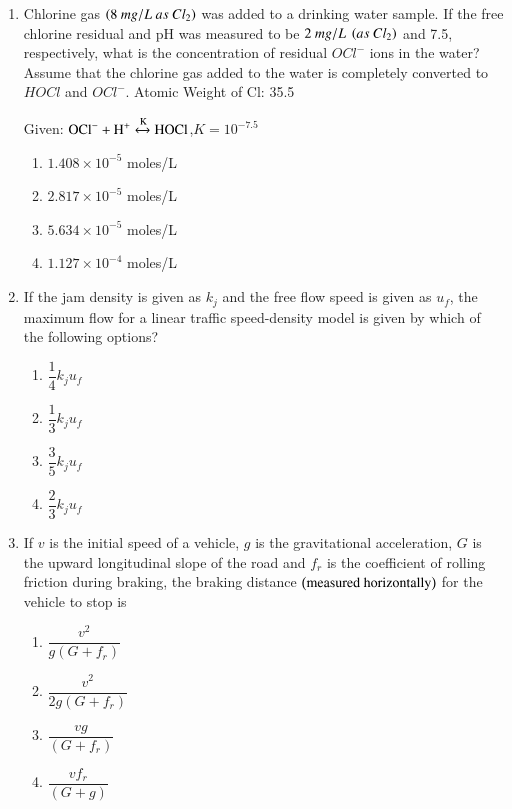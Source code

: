 \documentclass[journal,12pt,onecolumn]{IEEEtran}
\theoremstyle{remark}
\begin{document}
\begin{enumerate}
\item Chlorine gas $\left(8~mg/L~as~Cl_2\right)$ was added to a drinking water sample. If the free chlorine residual and pH was measured to be $2~mg/L~\left(as~Cl_2\right)$ and 7.5, respectively, what is the concentration of residual $OCl^-$ ions in the water? Assume that the chlorine gas added to the water is completely converted to $HOCl$ and $OCl^-$. Atomic Weight of Cl: 35.5

Given: $\text{OCl}^- + \text{H}^+ \xleftrightarrow{\text{K}} \text{HOCl}$,\quad $K = 10^{-7.5}$

\hfill{}
\begin{enumerate}
\item $1.408 \times 10^{-5}$ moles/L
\item $2.817 \times 10^{-5}$ moles/L
\item $5.634 \times 10^{-5}$ moles/L
\item $1.127 \times 10^{-4}$ moles/L
\end{enumerate}

\item If the jam density is given as $k_j$ and the free flow speed is given as $u_f$, the maximum flow for a linear traffic speed-density model is given by which of the following options?

\hfill{}
\begin{enumerate}
\item $\dfrac{1}{4} k_j u_f$
\item $\dfrac{1}{3} k_j u_f$
\item $\dfrac{3}{5} k_j u_f$
\item $\dfrac{2}{3} k_j u_f$
\end{enumerate}

\item If $v$ is the initial speed of a vehicle, $g$ is the gravitational acceleration, $G$ is the upward longitudinal slope of the road and $f_r$ is the coefficient of rolling friction during braking, the braking distance $\left(\text{measured horizontally}\right)$ for the vehicle to stop is

\hfill{}
\begin{enumerate}
\item $\dfrac{v^2}{g \left( G + f_r \right)}$
\item $\dfrac{v^2}{2g \left( G + f_r \right)}$
\item $\dfrac{vg}{\left( G + f_r \right)}$
\item $\dfrac{vf_r}{\left( G + g \right)}$
\end{enumerate}


\end{enumerate}
\end{document}
